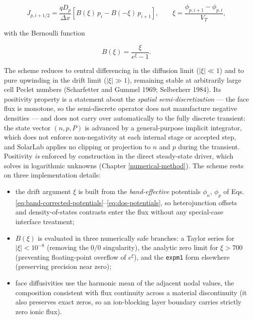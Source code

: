\documentclass[
  11pt,
  american,
]{report}
\providecommand{\tightlist}{%
  \setlength{\itemsep}{0pt}\setlength{\parskip}{0pt}}
\begin{document}
\begin{equation}
\label{eq:sg-hole}
J_{p,i+1/2}
=
\frac{qD_p}{\Delta x}
\left[
B(\xi)\,p_i-B(-\xi)\,p_{i+1}
\right],
\qquad
\xi = \frac{\phi_{p,i+1}-\phi_{p,i}}{V_T},
\end{equation}

with the Bernoulli function

\begin{equation}
\label{eq:bernoulli}
B(\xi)=\frac{\xi}{e^{\xi}-1}.
\end{equation}

The scheme reduces to central differencing in the diffusion limit
(\(|\xi| \ll 1\)) and to pure upwinding in the drift limit
(\(|\xi| \gg 1\)), remaining stable at arbitrarily large cell Peclet
numbers (Scharfetter and Gummel 1969; Selberherr 1984). Its positivity
property is a statement about the \emph{spatial semi-discretization} ---
the face flux is monotone, so the semi-discrete operator does not
manufacture negative densities --- and does not carry over automatically
to the fully discrete transient: the state vector \((n,p,P)\) is
advanced by a general-purpose implicit integrator, which does not
enforce non-negativity at each internal stage or accepted step, and
SolarLab applies no clipping or projection to \(n\) and \(p\) during the
transient. Positivity \emph{is} enforced by construction in the direct
steady-state driver, which solves in logarithmic unknowns (Chapter
\ref{numerical-method}). The scheme rests on three implementation
details:

\begin{itemize}
\tightlist
\item
  the drift argument \(\xi\) is built from the \emph{band-effective}
  potentials \(\phi_n\), \(\phi_p\) of Eqs.
  \ref{eq:band-corrected-potentials}--\ref{eq:dos-potentials}, so
  heterojunction offsets and density-of-states contrasts enter the flux
  without any special-case interface treatment;
\item
  \(B(\xi)\) is evaluated in three numerically safe branches: a Taylor
  series for \(|\xi|<10^{-8}\) (removing the \(0/0\) singularity), the
  analytic zero limit for \(\xi > 700\) (preventing floating-point
  overflow of \(e^{\xi}\)), and the \texttt{expm1} form elsewhere
  (preserving precision near zero);
\item
  face diffusivities use the harmonic mean of the adjacent nodal values,
  the composition consistent with flux continuity across a material
  discontinuity (it also preserves exact zeros, so an ion-blocking layer
  boundary carries strictly zero ionic flux).
\end{itemize}
\end{document}
